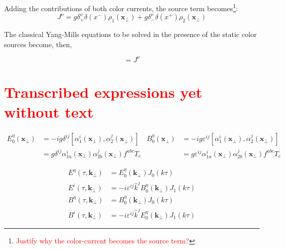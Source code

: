 Adding the contributions of both color currents, the source term becomes\textcolor{red}{\footnote{\textcolor{red}{Justify why the color-current becomes the source term?}}}:
\begin{equation}
J^\nu = g \delta^\nu_+ \delta (x^-) \rho_1 (\mathbf{x}_\perp) + g \delta^\nu_- \delta (x^+) \rho_2 (\mathbf{x}_\perp)
\end{equation}

The classical Yang-Mills equations to be solved in the presence of the static color sources become, then,

\begin{equation}
	 [D_\mu, F^{\mu \nu}] = J^\nu
\end{equation}

\section{\textcolor{red}{Transcribed expressions yet without text}}

\begin{subequations} \label{eq:initial_fields}
\begin{equation}
\begin{split}
E^\eta_0(\mathbf{x}_\perp) & = -ig \delta^{ij} [\alpha^i_1 (\mathbf{x}_\perp), \alpha^j_2(\mathbf{x}_\perp)] \\
 & = g \delta^{ij}   \alpha^i_{1a} (\mathbf{x}_\perp) \alpha^j_{2b}(\mathbf{x}_\perp)f^{abc} T_c
\end{split} \label{eq:initial_E}
\end{equation}
\begin{equation}
\begin{split}
B^\eta_0(\mathbf{x}_\perp) & = -ig \varepsilon^{ij} [\alpha^i_1 (\mathbf{x}_\perp), \alpha^j_2(\mathbf{x}_\perp)] \\
& = g \varepsilon^{ij} \alpha^i_{1a} (\mathbf{x}_\perp) \alpha^j_{2b}(\mathbf{x}_\perp) f^{abc} T_c
\end{split} \label{eq:initial_B}
\end{equation}
\end{subequations}

\begin{subequations} \label{eq:EB_from_initial_EB}
\begin{align}
E^\eta(\tau,\mathbf{k}_\perp) & = E^\eta_0 (\mathbf{k}_\perp) J_0 (k \tau) \\
E^i(\tau,\mathbf{k}_\perp) & = -i \varepsilon^{ij} \hat{k}^j B_0^\eta (\mathbf{k}_\perp) J_1 (k \tau) \\ 
B^\eta(\tau,\mathbf{k}_\perp) & = B^\eta_0 (\mathbf{k}_\perp) J_0 (k \tau) \\
B^i(\tau,\mathbf{k}_\perp) & = -i \varepsilon^{ij} \hat{k}^j E_0^\eta (\mathbf{k}_\perp) J_1 (k \tau)
\end{align}
\end{subequations}

